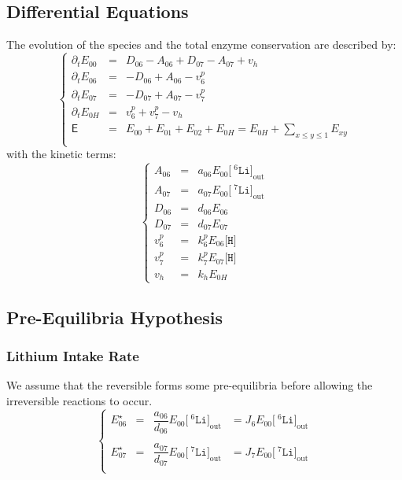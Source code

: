 \documentclass[aps,onecolumn,11pt]{revtex4}
\newcommand{\mychem}[1]{\mathtt{#1}}
\newcommand{\myconc}[1]{\big[#1\big]}
\newcommand{\spLi}[1]{{\!~^{#1}\mychem{Li}}}
\newcommand{\Li}[1]{\myconc{\spLi{#1}}}
\newcommand{\spproton}{\mychem{H}}
\newcommand{\proton}{\myconc{\spproton}}
\newcommand{\myout}[1]{{#1}_{\mathrm{out}}}
\newcommand{\LiOut}[1]{\myout{\Li{#1}}}
\begin{document}
\subsection{Differential Equations}
The evolution of the species and the total enzyme conservation are described by:
\begin{equation}
\left\lbrace
\begin{array}{rcl}
\partial_t E_{00} & = & D_{06}-A_{06} + D_{07}-A_{07} + v_h\\
\partial_t E_{06} & = & -D_{06}+A_{06} -v^p_6 \\
\partial_t E_{07} & = & -D_{07}+A_{07} -v^p_7\\
\partial_t E_{0H} & = & v^p_6 + v^p_7 - v_h\\
\mathsf{E}       & = & E_{00}+E_{01}+E_{02} + E_{0H} = E_{0H} + {\displaystyle \sum_{x\leq y\leq 1} E_{xy}}\\
\end{array}
\right.
\end{equation}
with the kinetic terms:
\begin{equation}
\left\lbrace
\begin{array}{rcl}
A_{06} &= &a_{06} E_{00} \LiOut{6}\\
A_{07} &= &a_{07} E_{00} \LiOut{7}\\
D_{06} &= &d_{06} E_{06}\\
D_{07} &= &d_{07} E_{07}\\
v^p_6  &=& k^p_6 E_{06} \proton\\
v^p_7  &=& k^p_7 E_{07} \proton\\
v_h    &=& k_h   E_{0H}
\end{array}
\right.
\end{equation}

\subsection{Pre-Equilibria Hypothesis}
\subsubsection{Lithium Intake Rate}
We assume that the reversible forms some pre-equilibria before allowing the irreversible reactions to occur.
\begin{equation}
\left\lbrace
\begin{array}{rcll}
	E_{06}^\star & = & \dfrac{a_{06}}{d_{06} } E_{00} \LiOut{6} & = J_6 E_{00} \LiOut{6}\\
	\\
	E_{07}^\star & = & \dfrac{a_{07}}{d_{07}  } E_{00} \LiOut{7} & = J_7 E_{00} \LiOut{7}\\
\end{array}
\right.
\end{equation}
\end{document}
